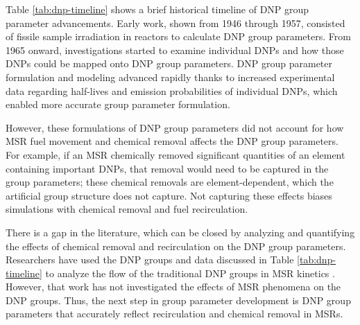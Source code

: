 Table \ref{tab:dnp-timeline} shows a brief historical timeline of \gls{DNP} group parameter advancements.
Early work, shown from 1946 through 1957, consisted of fissile sample irradiation in reactors to calculate \gls{DNP} group parameters.
From 1965 onward, investigations started to examine individual \glspl{DNP} and how those \glspl{DNP} could be mapped onto \gls{DNP} group parameters.
\Gls{DNP} group parameter formulation and modeling advanced rapidly thanks to increased experimental data regarding half-lives and emission probabilities of individual \glspl{DNP}, which enabled more accurate group parameter formulation.

However, these formulations of \gls{DNP} group parameters did not account for how \gls{MSR} fuel movement and chemical removal affects the \gls{DNP} group parameters.
For example, if an \gls{MSR} chemically removed significant quantities of an element containing important \glspl{DNP}, that removal would need to be captured in the group parameters; these chemical removals are element-dependent, which the artificial group structure does not capture.
Not capturing these effects biases simulations with chemical removal and fuel recirculation.

There is a gap in the literature, which can be closed by analyzing and quantifying the effects of chemical removal and recirculation on the \gls{DNP} group parameters.
Researchers have used the \gls{DNP} groups and data discussed in Table \ref{tab:dnp-timeline} to analyze the flow of the traditional \gls{DNP} groups in \gls{MSR} kinetics \cite{zhang2009analysis, zuo2022flow, lee2022transient, shi2021gen, kupriyanov2022effective}.
However, that work has not investigated the effects of \gls{MSR} phenomena on the \gls{DNP} groups.
Thus, the next step in group parameter development is \gls{DNP} group parameters that accurately reflect recirculation and chemical removal in \glspl{MSR}.


